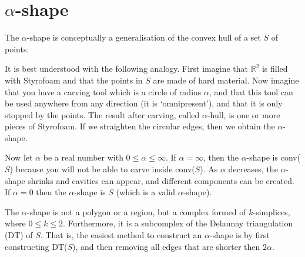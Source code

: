 %
\section{$\alpha$-shape}

The $\alpha$-shape is conceptually a generalisation of the convex hull of a set $S$ of points.

%

It is best understood with the following analogy.
First imagine that $\mathbb{R}^2$ is filled with Styrofoam and that the points in $S$ are made of hard material.
Now imagine that you have a carving tool which is a circle of radius $\alpha$, and that this tool can be used anywhere from any direction (it is `omnipresent'), and that it is only stopped by the points.
The result after carving, called $\alpha$-hull, is one or more pieces of Styrofoam.
If we straighten the circular edges, then we obtain the $\alpha$-shape.

%

Now let $\alpha$ be a real number with $0 \leq \alpha \leq \infty$.
If $\alpha = \infty$, then the $\alpha$-shape is conv($S$) because you will not be able to carve inside conv($S$).
As $\alpha$ decreases, the $\alpha$-shape shrinks and cavities can appear, and different components can be created.
If $\alpha = 0$ then the $\alpha$-shape is $S$ (which is a valid $\alpha$-shape).

%

The $\alpha$-shape is not a polygon or a region, but a complex formed of $k$-simplices, where $0 \leq k \leq 2$.
Furthermore, it is a subcomplex of the Delaunay triangulation (DT) of $S$.
That is, the easiest method to construct an $\alpha$-shape is by first constructing DT($S$), and then removing all edges that are shorter then $2\alpha$.

